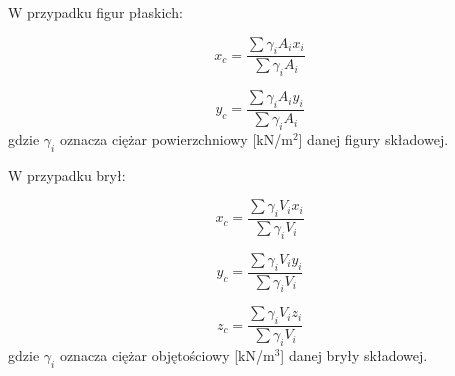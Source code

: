 W przypadku figur płaskich:

\begin{equation}
    x_c = \dfrac{\sum \gamma_i A_i x_i}{\sum \gamma_i A_i}
\end{equation}

\[
    y_c = \dfrac{\sum \gamma_i A_i y_i}{\sum \gamma_i A_i}
\]
gdzie $\gamma_i$ oznacza ciężar powierzchniowy [kN/m$^2$] danej figury składowej.

W przypadku brył:

\begin{equation}
    x_c = \dfrac{\sum \gamma_i V_i x_i}{\sum \gamma_i V_i}
\end{equation}

\[
    y_c = \dfrac{\sum \gamma_i V_i y_i}{\sum \gamma_i V_i}
\]

\[
    z_c = \dfrac{\sum \gamma_i V_i z_i}{\sum \gamma_i V_i}
\]
gdzie $\gamma_i$ oznacza ciężar objętościowy [kN/m$^3$] danej bryły składowej.